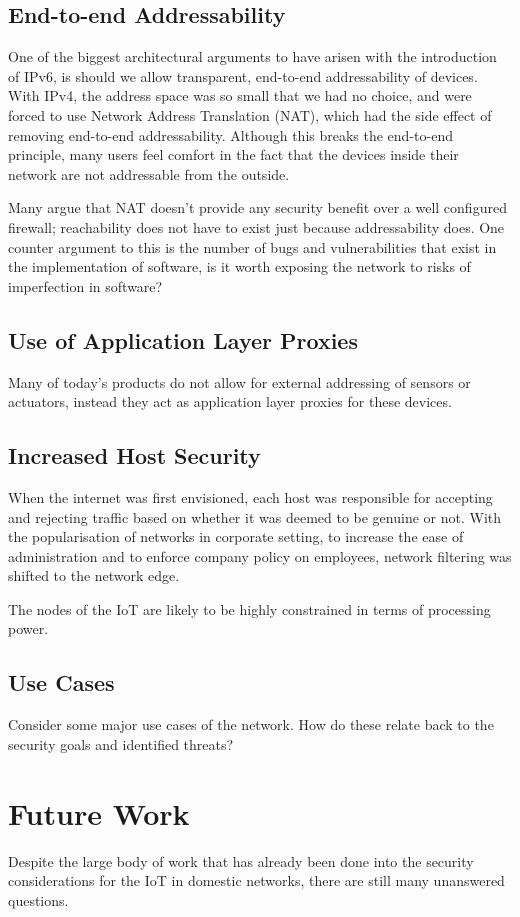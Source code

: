\documentclass[10pt,journal,compsoc]{IEEEtran}
\begin{document}
\subsection{End-to-end Addressability}
One of the biggest architectural arguments to have arisen with the introduction
of IPv6, is should we allow transparent, end-to-end addressability of devices.
With IPv4, the address space was so small that we had no choice, and were
forced to use Network Address Translation (NAT), which had the side effect of
removing end-to-end addressability. Although this breaks the end-to-end
principle, many users feel comfort in the fact that the devices inside their
network are not addressable from the outside.  

Many argue that NAT doesn't provide any security benefit over a well configured
firewall; reachability does not have to exist just because addressability does.
One counter argument to this is the number of bugs and vulnerabilities that
exist in the implementation of software, is it worth exposing the network to
risks of imperfection in software?

\subsection{Use of Application Layer Proxies}
Many of today's products do not allow for external addressing of sensors or
actuators, instead they act as application layer proxies for these devices.  

\subsection{Increased Host Security}
When the internet was first envisioned, each host was responsible for accepting
and rejecting traffic based on whether it was deemed to be genuine or not. With
the popularisation of networks in corporate setting, to increase the ease of
administration and to enforce company policy on employees, network filtering
was shifted to the network edge.

The nodes of the IoT are likely to be highly constrained in terms of processing
power. 

\subsection{Use Cases}
Consider some major use cases of the network.
How do these relate back to the security goals and identified threats?


\section{Future Work}
Despite the large body of work that has already been done into the security
considerations for the IoT in domestic networks, there are still many
unanswered questions. 
\end{document}
